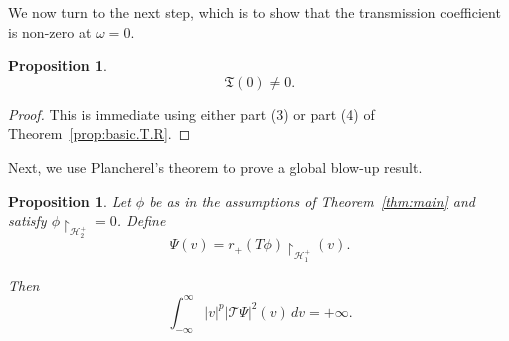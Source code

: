 \documentclass[10pt, reqno]{amsart}
\newtheorem{proposition}[theorem]{Proposition}
\theoremstyle{definition}
\theoremstyle{remark}
\numberwithin{equation}{section}
\newcommand{\0}{\emptyset}
\newcommand{\om}{\omega}
\newcommand{\calH}{\mathcal H}
\newcommand{\EH}{\calH^{+}}
\begin{document}
We now turn to the next step, which is to show that the transmission coefficient is non-zero at $\om=0$. %



\begin{proposition}\label{prop:T0neq0}
$$\mathfrak T(0)\neq 0.$$
\end{proposition}
\begin{proof}
This is immediate using either part (3) or part (4) of Theorem~\ref{prop:basic.T.R}. \qedhere
\end{proof}

Next, we use Plancherel's theorem to prove a global blow-up result.
\begin{proposition}\label{prop:global.blowup}
Let $\phi$ be as in the assumptions of Theorem~\ref{thm:main} and satisfy $\phi\restriction_{\mathcal{H}^+_2} = 0$. Define 
\begin{equation}\label{eq:def.Psi.in.theorem}
\Psi(v) = r_+ (T\phi)\restriction_{\EH_1}(v).
\end{equation}

Then
$$\int_{-\infty}^{\infty} |v|^{p}|\mathcal T \Psi|^2(v)\, dv = +\infty.$$
\end{proposition}
\end{document}
